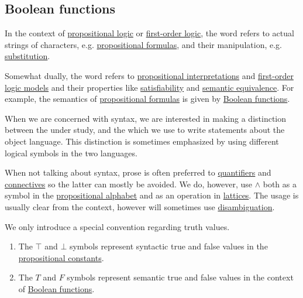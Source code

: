 \subsection{Boolean functions}\label{subsec:boolean_functions}

\begin{remark}\label{remark:metalanguage_syntax_and_semantics}
  In the context of \hyperref[subsec:propositional_logic]{propositional logic} or \hyperref[subsec:first_order_logic]{first-order logic}, the word  refers to actual strings of characters, e.g. \hyperref[def:propositional_language]{propositional formulas}, and their manipulation, e.g. \hyperref[def:propositional_substition]{substitution}.

  Somewhat dually, the word  refers to \hyperref[def:propositional_interpretation]{propositional interpretations} and \hyperref[def:first_order_model]{first-order logic models} and their properties like \hyperref[def:propositional_interpretation/satisfiability]{satisfiability} and \hyperref[def:propositional_interpretation/equivalence]{semantic equivalence}. For example, the semantics of \hyperref[def:propositional_language]{propositional formulas} is given by \hyperref[def:boolean_function]{Boolean functions}.

  When we are concerned with syntax, we are interested in making a distinction between the  under study, and the  which we use to write statements about the object language. This distinction is sometimes emphasized by using different logical symbols in the two languages.

  When not talking about syntax, prose is often preferred to \hyperref[def:first_order_logic_alphabet/quantifiers]{quantifiers} and \hyperref[def:propositional_alphabet/connectives]{connectives} so the latter can mostly be avoided. We do, however, use \( \wedge \) both as a symbol in the \hyperref[def:propositional_alphabet]{propositional alphabet} and as an operation in \hyperref[def:binary_lattice_operations/meet]{lattices}. The usage is usually clear from the context, however will sometimes use \hyperref[thm:propositional_connectives_ambiguity]{disambiguation}.

  We only introduce a special convention regarding truth values.
  \begin{enumerate}
    \item The \( \top \) and \( \bot \) symbols represent syntactic true and false values in the \hyperref[def:propositional_alphabet/constants]{propositional constants}.
    \item The \( T \) and \( F \) symbols represent semantic true and false values in the context of \hyperref[def:boolean_function]{Boolean functions}.
  \end{enumerate}
\end{remark}


